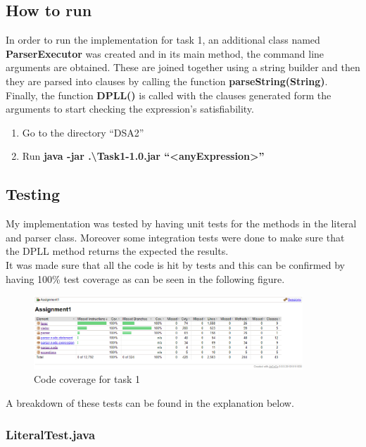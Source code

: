 \documentclass{article}
\newcommand{\quotes}[1]{``#1''}
\begin{document}
		
\subsection{How to run}

In order to run the implementation for task 1, an additional class named \textbf{ParserExecutor} was created and in its main method, the command line arguments are obtained. These are joined together using a string builder and then they are parsed into clauses by calling the function \textbf{parseString(String)}. Finally, the function \textbf{DPLL()} is called with the clauses generated form the arguments to start checking the expression's satisfiability. 

\begin{enumerate}
\item Go to the directory \quotes{DSA2}
\item Run \textbf{java -jar .\textbackslash Task1-1.0.jar \quotes{\textless anyExpression\textgreater}}
\end{enumerate}

		\subsection{Testing}
		
	My implementation was tested by having unit tests for the methods in the literal and parser class. Moreover some integration tests were done to make sure that the DPLL method returns the expected the results.\\
	It was made sure that all the code is hit by tests and this can be confirmed by having 100\% test coverage as can be seen in the following figure.
	
		\begin{figure}[H]
					\centering
			 			\includegraphics[width=0.9\textwidth]{task1cov.png}
			 			\centering
			  			\caption{Code coverage for task 1}
			  			\label{fig:task1cov}
					\end{figure}
	
	
	A breakdown of these tests can be found in the explanation below.

	\subsubsection{LiteralTest.java}
	
\end{document}
